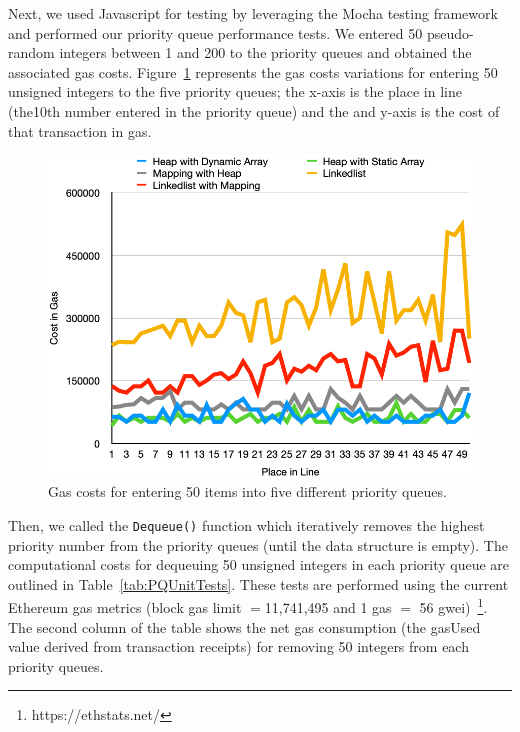 

Next, we used Javascript for testing by leveraging the Mocha testing framework and performed our priority queue performance tests. We entered 50 pseudo-random integers between 1 and 200 to the priority queues and obtained the associated gas costs. Figure~\ref{fig:random_insertion} represents the gas costs variations for entering 50 unsigned integers to the five priority queues; the x-axis is the place in line (\eg the10th number entered in the priority queue) and the and y-axis is the cost of that transaction in gas.


\begin{figure}[htb!p]
\centering
\includegraphics[width=1\textwidth]{fig/random_insertion.png}
\caption{\footnotesize{Gas costs for entering 50 items into five different priority queues.}  \label{fig:random_insertion}}
\end{figure}


Then, we called the \texttt{Dequeue()} function which iteratively removes the highest priority number from the priority queues (until the data structure is empty). The computational costs for dequeuing 50 unsigned integers in each priority queue are outlined in Table~\ref{tab:PQUnitTests}. These tests are performed using the current Ethereum gas metrics (block gas limit $=$11,741,495 and 1 gas $=$ 56 gwei)~\footnote{https://ethstats.net/}. The second column of the table shows the net gas consumption (the gasUsed value derived from transaction receipts) for removing 50 integers from each priority queues.  


